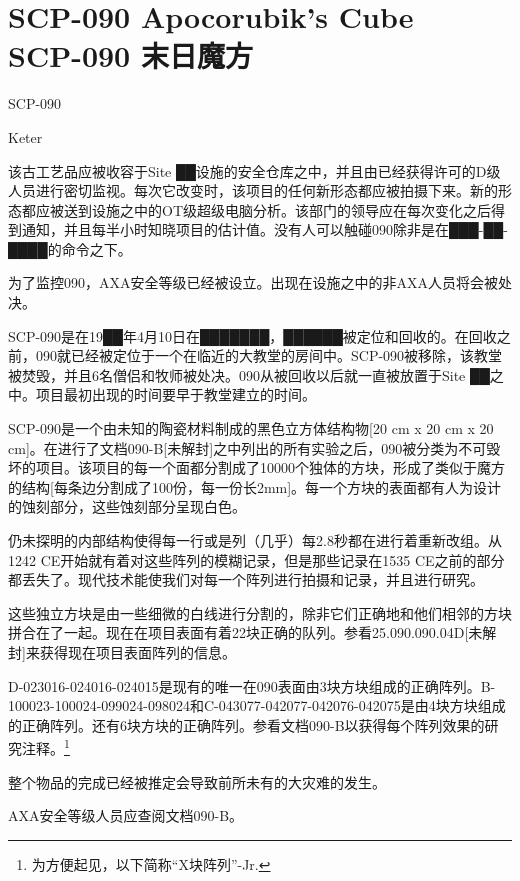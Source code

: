 \chapter[SCP-090 末日魔方]{
    SCP-090 Apocorubik's Cube\\
    SCP-090 末日魔方
}

\label{chap:SCP-090}

SCP-090

Keter

该古工艺品应被收容于Site ██设施的安全仓库之中，并且由已经获得许可的D级人员进行密切监视。每次它改变时，该项目的任何新形态都应被拍摄下来。新的形态都应被送到设施之中的OT级超级电脑分析。该部门的领导应在每次变化之后得到通知，并且每半小时知晓项目的估计值。没有人可以触碰090除非是在███-██-████的命令之下。

为了监控090，AXA安全等级已经被设立。出现在设施之中的非AXA人员将会被处决。

SCP-090是在19██年4月10日在███████，██████被定位和回收的。在回收之前，090就已经被定位于一个在临近的大教堂的房间中。SCP-090被移除，该教堂被焚毁，并且6名僧侣和牧师被处决。090从被回收以后就一直被放置于Site ██之中。项目最初出现的时间要早于教堂建立的时间。

SCP-090是一个由未知的陶瓷材料制成的黑色立方体结构物{[}20 cm x 20 cm x 20 cm]。在进行了文档090-B{[}未解封]之中列出的所有实验之后，090被分类为不可毁坏的项目。该项目的每一个面都分割成了10000个独体的方块，形成了类似于魔方的结构{[}每条边分割成了100份，每一份长2mm]。每一个方块的表面都有人为设计的蚀刻部分，这些蚀刻部分呈现白色。

仍未探明的内部结构使得每一行或是列（几乎）每2.8秒都在进行着重新改组。从1242 CE开始就有着对这些阵列的模糊记录，但是那些记录在1535 CE之前的部分都丢失了。现代技术能使我们对每一个阵列进行拍摄和记录，并且进行研究。

这些独立方块是由一些细微的白线进行分割的，除非它们正确地和他们相邻的方块拼合在了一起。现在在项目表面有着22块正确的队列。参看25.090.090.04D{[}未解封]来获得现在项目表面阵列的信息。

D-023016-024016-024015是现有的唯一在090表面由3块方块组成的正确阵列。B-100023-100024-099024-098024和C-043077-042077-042076-042075是由4块方块组成的正确阵列。还有6块方块的正确阵列。参看文档090-B以获得每个阵列效果的研究注释。\footnote{为方便起见，以下简称“X块阵列”-Jr.}

整个物品的完成已经被推定会导致前所未有的大灾难的发生。

AXA安全等级人员应查阅文档090-B。

